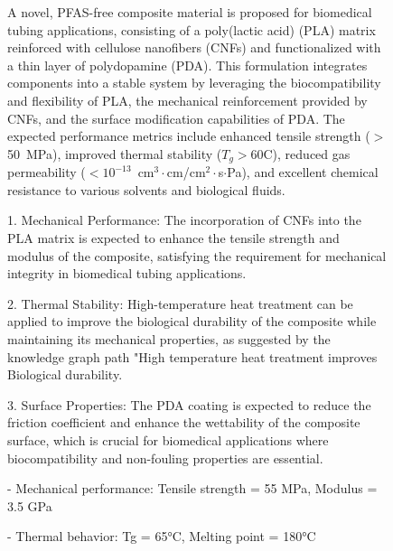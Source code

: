 \begin{figure}[t!]
  \begin{mdframed}[
    frametitle={Generated Hypothesis as a Result of Shortest Simple Path Algorithm},
    frametitlefont=\bfseries\sffamily\small,
    backgroundcolor=white,
    linecolor=black,
    linewidth=0.5pt,
    innerleftmargin=6pt,
    innerrightmargin=6pt,
    innertopmargin=6pt,
    innerbottommargin=6pt
  ]
    \ttfamily\scriptsize
    
    \textbf{}
    
    A novel, PFAS-free composite material is proposed for biomedical tubing applications, consisting of a poly(lactic acid) (PLA) matrix reinforced with cellulose nanofibers (CNFs) and functionalized with a thin layer of polydopamine (PDA). This formulation integrates components into a stable system by leveraging the biocompatibility and flexibility of PLA, the mechanical reinforcement provided by CNFs, and the surface modification capabilities of PDA. The expected performance metrics include enhanced tensile strength ($>$50~MPa), improved thermal stability ($T_g > 60$\textdegree C), reduced gas permeability ($<10^{-13}$~cm$^3\cdot$cm/cm$^2\cdot$s$\cdot$Pa), and excellent chemical resistance to various solvents and biological fluids.
    
    \textbf{}
    
    1. Mechanical Performance: The incorporation of CNFs into the PLA matrix is expected to enhance the tensile strength and modulus of the composite, satisfying the requirement for mechanical integrity in biomedical tubing applications.
    
    2. Thermal Stability: High-temperature heat treatment can be applied to improve the biological durability of the composite while maintaining its mechanical properties, as suggested by the knowledge graph path "High temperature heat treatment improves Biological durability.
    
    3. Surface Properties: The PDA coating is expected to reduce the friction coefficient and enhance the wettability of the composite surface, which is crucial for biomedical applications where biocompatibility and non-fouling properties are essential.
    
    \textbf{}
    
    - Mechanical performance:  Tensile strength = 55 MPa, Modulus = 3.5 GPa
    
    - Thermal behavior: Tg = 65°C, Melting point = 180°C
    

\end{mdframed}
\end{figure}
